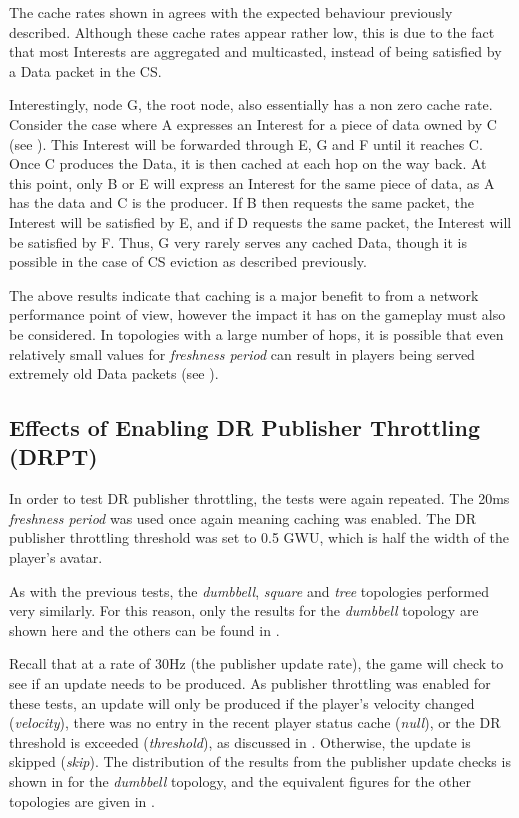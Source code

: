 The cache rates shown in  agrees with the expected behaviour previously described. Although these cache rates appear rather low, this is due to the fact that most Interests are aggregated and multicasted, instead of being satisfied by a Data packet in the CS.

Interestingly, node G, the root node, also essentially has a non zero cache rate. Consider the case where A expresses an Interest for a piece of data owned by C (see ). This Interest will be forwarded through E, G and F until it reaches C. Once C produces the Data, it is then cached at each hop on the way back. At this point, only B or E will express an Interest for the same piece of data, as A has the data and C is the producer. If B then requests the same packet, the Interest will be satisfied by E, and if D requests the same packet, the Interest will be satisfied by F. Thus, G very rarely serves any cached Data, though it is possible in the case of CS eviction as described previously. 

The above results indicate that caching is a major benefit to \game{} from a network performance point of view, however the impact it has on the gameplay must also be considered. In topologies with a large number of hops, it is possible that even relatively small values for \textit{freshness period} can result in players being served extremely old Data packets (see ).


\subsection{Effects of Enabling DR Publisher Throttling (DRPT)}
In order to test DR publisher throttling, the tests were again repeated. The 20ms \textit{freshness period} was used once again meaning caching was enabled. The DR publisher throttling threshold was set to 0.5 GWU, which is half the width of the player's avatar. 

As with the previous tests, the \textit{dumbbell}, \textit{square} and \textit{tree} topologies performed very similarly. For this reason, only the results for the \textit{dumbbell} topology are shown here and the others can be found in .

Recall that at a rate of 30Hz (the publisher update rate), the game will check to see if an update needs to be produced. As publisher throttling was enabled for these tests, an update will only be produced if the player's velocity changed (\textit{velocity}), there was no entry in the recent player status cache (\textit{null}), or the DR threshold is exceeded (\textit{threshold}), as discussed in . Otherwise, the update is skipped (\textit{skip}). The distribution of the results from the publisher update checks is shown in  for the \textit{dumbbell} topology, and the equivalent figures for the other topologies are given in .


